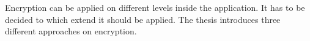 Encryption can be applied on different levels inside the application.
It has to be decided to which extend it should be applied.
The thesis introduces three different approaches on encryption.
